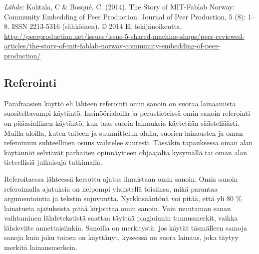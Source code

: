 \documentclass[finnish, 12pt, a4paper, arts, utf8, a-2b, online]{aaltothesis}
\begin{document}
\vspace{1ex}
{\centering
{}
}

\vspace{1ex}
\noindent
\textit{Lähde:} Kohtala, C \& Bosqu\'e, C. (2014). The Story of MIT-Fablab 
Norway: Community Embedding of Peer Production. Journal of Peer Production, 
5 (8): 1--8. ISSN 2213-5316 (sähköinen). \copyright{} 2014 Ei tekijänoikeutta. 
\url{http://peerproduction.net/issues/issue-5-shared-machine-shops/peer-reviewed-articles/the-story-of-mit-fablab-norway-community-embedding-of-peer-production/}


\subsection*{Referointi}

Parafraasien käyttö eli lähteen referointi omin sanoin on suoraa lainaamista 
suositeltavampi käytäntö. Insinöörialoilla ja perustieteissä omin sanoin 
referointi on pääasiallinen käytäntö, kun taas suoria lainauksia käytetään 
säästeliäästi. Muilla aloilla, kuten taiteen ja suunnittelun alalla, suorien 
lainausten ja oman referoinnin suhteellinen osuus vaihtelee suuresti. Tässäkin 
tapauksessa oman alan käytännöt selviävät parhaiten opinnäytteen ohjaajalta 
kysymällä tai oman alan tieteellisiä julkaisuja tutkimalla.

Referoitaessa lähteessä kerrottu ajatus ilmaistaan omin sanoin. Omin sanoin 
referoimalla ajatuksia on helpompi yhdistellä toisiinsa, mikä parantaa 
argumentointia ja tekstin sujuvuutta. Nyrkkisääntönä voi pitää, että yli 80 \% 
lainatusta ajatuksista pitää kirjoittaa omin sanoin. Vain muutaman sanan 
vaihtaminen lähdetekstistä saattaa täyttää plagioinnin tunnusmerkit, vaikka 
lähdeviite annettaisiinkin. Sanoilla on merkitystä: jos käytät täsmälleen samoja
sanoja kuin joku toinen on käyttänyt, kyseessä on suora lainaus, joka täytyy 
merkitä lainausmerkein.
\end{document}
